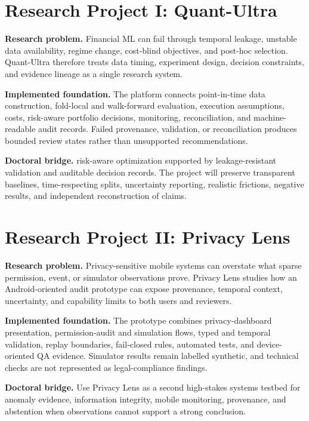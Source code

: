 \documentclass[11pt]{article}
\begin{document}
\section*{Research Project I: Quant-Ultra}
\textbf{Research problem.} Financial ML can fail through temporal leakage, unstable data availability, regime change, cost-blind objectives, and post-hoc selection. Quant-Ultra therefore treats data timing, experiment design, decision constraints, and evidence lineage as a single research system.

\textbf{Implemented foundation.} The platform connects point-in-time data construction, fold-local and walk-forward evaluation, execution assumptions, costs, risk-aware portfolio decisions, monitoring, reconciliation, and machine-readable audit records. Failed provenance, validation, or reconciliation produces bounded review states rather than unsupported recommendations.

\textbf{Doctoral bridge.} risk-aware optimization supported by leakage-resistant validation and auditable decision records. The project will preserve transparent baselines, time-respecting splits, uncertainty reporting, realistic frictions, negative results, and independent reconstruction of claims.

\section*{Research Project II: Privacy Lens}
\textbf{Research problem.} Privacy-sensitive mobile systems can overstate what sparse permission, event, or simulator observations prove. Privacy Lens studies how an Android-oriented audit prototype can expose provenance, temporal context, uncertainty, and capability limits to both users and reviewers.

\textbf{Implemented foundation.} The prototype combines privacy-dashboard presentation, permission-audit and simulation flows, typed and temporal validation, replay boundaries, fail-closed rules, automated tests, and device-oriented QA evidence. Simulator results remain labelled synthetic, and technical checks are not represented as legal-compliance findings.

\textbf{Doctoral bridge.} Use Privacy Lens as a second high-stakes systems testbed for anomaly evidence, information integrity, mobile monitoring, provenance, and abstention when observations cannot support a strong conclusion.
\end{document}

